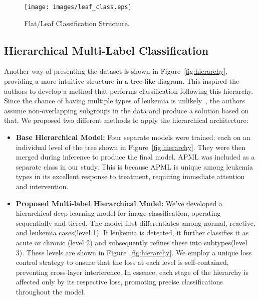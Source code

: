 \documentclass[runningheads]{llncs}
\begin{document}
\begin{figure}[!ht]
  \centering
  \texttt{[image: images/leaf\_class.eps]}  
  \caption{Flat/Leaf Classification Structure.}
  \label{fig:leaf}
\end{figure}
\vspace{-15pt}

\subsection{Hierarchical Multi-Label Classification}
Another way of presenting the dataset is shown in Figure~\ref{fig:hierarchy}, providing a more intuitive structure in a tree-like diagram. This inspired the authors to develop a method that performs classification following this hierarchy. Since the chance of having multiple types of leukemia is unlikely~\cite{george2022mixed}, the authors assume non-overlapping subgroups in the data and produce a solution based on that. We proposed two different methods to apply the hierarchical architecture:
\begin{itemize}
    \item \textbf{Base Hierarchical Model:} Four separate models were trained; each on an individual level of the tree shown in Figure~\ref{fig:hierarchy}. They were then merged during inference to produce the final model. APML was included as a separate class in our study. This is because APML is unique among leukemia types in its excellent response to treatment, requiring immediate attention and intervention.
    \\
    \item \textbf{Proposed Multi-label Hierarchical  Model:} We've developed a hierarchical deep learning model for image classification, operating sequentially and tiered. The model first differentiates among normal, reactive, and leukemia cases(level 1). If leukemia is detected, it further classifies it as acute or chronic (level 2) and subsequently refines these into subtypes(level 3). These levels are shown in Figure~\ref{fig:hierarchy}. We employ a unique loss control strategy to ensure that the loss at each level is self-contained, preventing cross-layer interference. In essence, each stage of the hierarchy is affected only by its respective loss, promoting precise classifications throughout the model.
\end{itemize}



\end{document}
